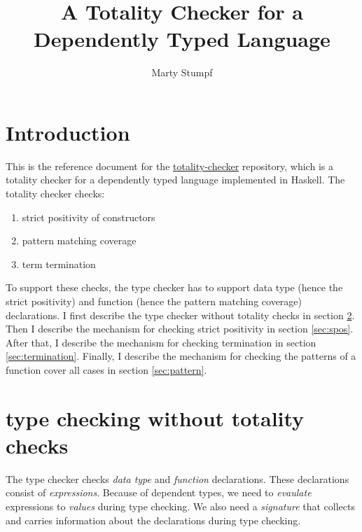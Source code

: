 \documentclass[acmsmall]{acmart}
\begin{document}
\title{A Totality Checker for a Dependently Typed Language}

%
\author{Marty Stumpf}

%

%
%
\maketitle
\thispagestyle{empty}
\tableofcontents
\clearpage
\section{Introduction}

This is the reference document for the
\href{https://github.com/thealmarty/totality-checker}{totality-checker}
repository, which is a totality checker for a dependently typed language
implemented in Haskell. The totality checker checks:

\begin{enumerate}
  \item strict positivity of constructors
  \item pattern matching coverage
  \item term termination
\end{enumerate}

To support these checks, the type checker has to support data type (hence the
strict positivity) and function (hence the pattern matching coverage)
declarations. I first describe the type checker without totality checks in
section \ref{sec:prelim}. Then I describe the mechanism for checking strict positivity
in section \ref{sec:spos}. After that, I describe the mechanism for checking
termination in section \ref{sec:termination}. Finally, I describe the mechanism
for checking the patterns of a function cover all cases in section
\ref{sec:pattern}.

\section{type checking without totality checks}
\label{sec:prelim}
The type checker checks \emph{data type} and \emph{function} declarations. These declarations
consist of \emph{expressions}. Because of dependent types, we need to \emph{evaulate} expressions to \emph{values} during type checking. We also need a \emph{signature} that collects and carries information about the declarations during type checking.
\end{document}
